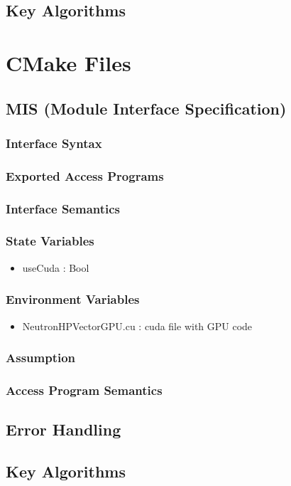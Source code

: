\documentclass[12pt]{article}
\begin{document}
\subsection{Key Algorithms}

\section{CMake Files}

\subsection{MIS (Module Interface Specification)}
\subsubsection{Interface Syntax}%

\subsubsection{Exported Access Programs}%

\subsubsection{Interface Semantics}

\subsubsection{State Variables}%
\begin{itemize}
\item useCuda : Bool
\end{itemize}

\subsubsection{Environment Variables}%
\begin{itemize}
\item NeutronHPVectorGPU.cu : cuda file with GPU code
\end{itemize}


\subsubsection{Assumption}%

\subsubsection{Access Program Semantics}%

\subsection{Error Handling}

\subsection{Key Algorithms}
\end{document}
